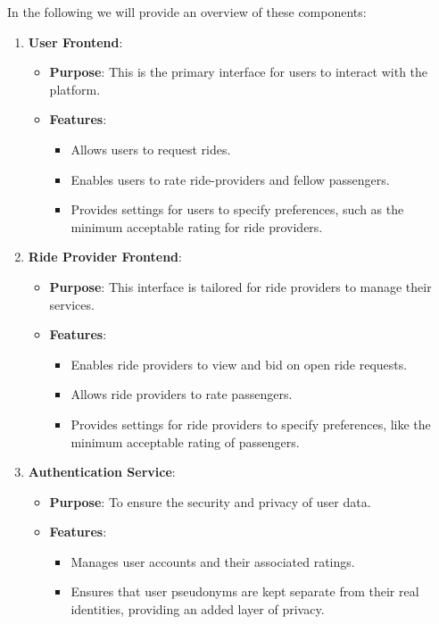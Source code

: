 In the following we will provide an overview of these components:

\begin{enumerate}
    \item \textbf{User Frontend}:
    \begin{itemize}
        \item \textbf{Purpose}: This is the primary interface for users to interact with the platform.
        \item \textbf{Features}:
        \begin{itemize}
            \item Allows users to request rides.
            \item Enables users to rate ride-providers and fellow passengers.
            \item Provides settings for users to specify preferences, such as the minimum acceptable rating for ride providers.
        \end{itemize}
    \end{itemize}

    \item \textbf{Ride Provider Frontend}:
    \begin{itemize}
        \item \textbf{Purpose}: This interface is tailored for ride providers to manage their services.
        \item \textbf{Features}:
        \begin{itemize}
            \item Enables ride providers to view and bid on open ride requests.
            \item Allows ride providers to rate passengers.
            \item Provides settings for ride providers to specify preferences, like the minimum acceptable rating of passengers.
        \end{itemize}
    \end{itemize}

    \item \textbf{Authentication Service}:
    \begin{itemize}
        \item \textbf{Purpose}: To ensure the security and privacy of user data.
        \item \textbf{Features}:
        \begin{itemize}
            \item Manages user accounts and their associated ratings.
            \item Ensures that user pseudonyms are kept separate from their real identities, providing an added layer of privacy.
        \end{itemize}
    \end{itemize}


\end{enumerate}
